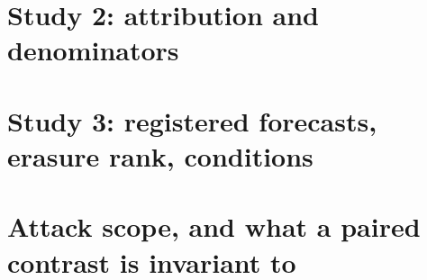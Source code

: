 \documentclass[10pt]{article}
\begin{document}
\section{Study 2: attribution and denominators}
\label{app:study2}
\begin{center}\small\end{center}
\begin{center}\small\end{center}
\begin{center}\small\end{center}
\begin{center}\scriptsize\end{center}

\section{Study 3: registered forecasts, erasure rank, conditions}
\label{app:study3}
\begin{center}\small\end{center}
\noindent\footnotesize\noteErasureRank\normalsize
\begin{center}\small\end{center}

\section{Attack scope, and what a paired contrast is invariant to}
\label{app:scope}
\begin{center}\small\end{center}
\noindent\footnotesize\noteScopeDecomposition\normalsize
\end{document}
